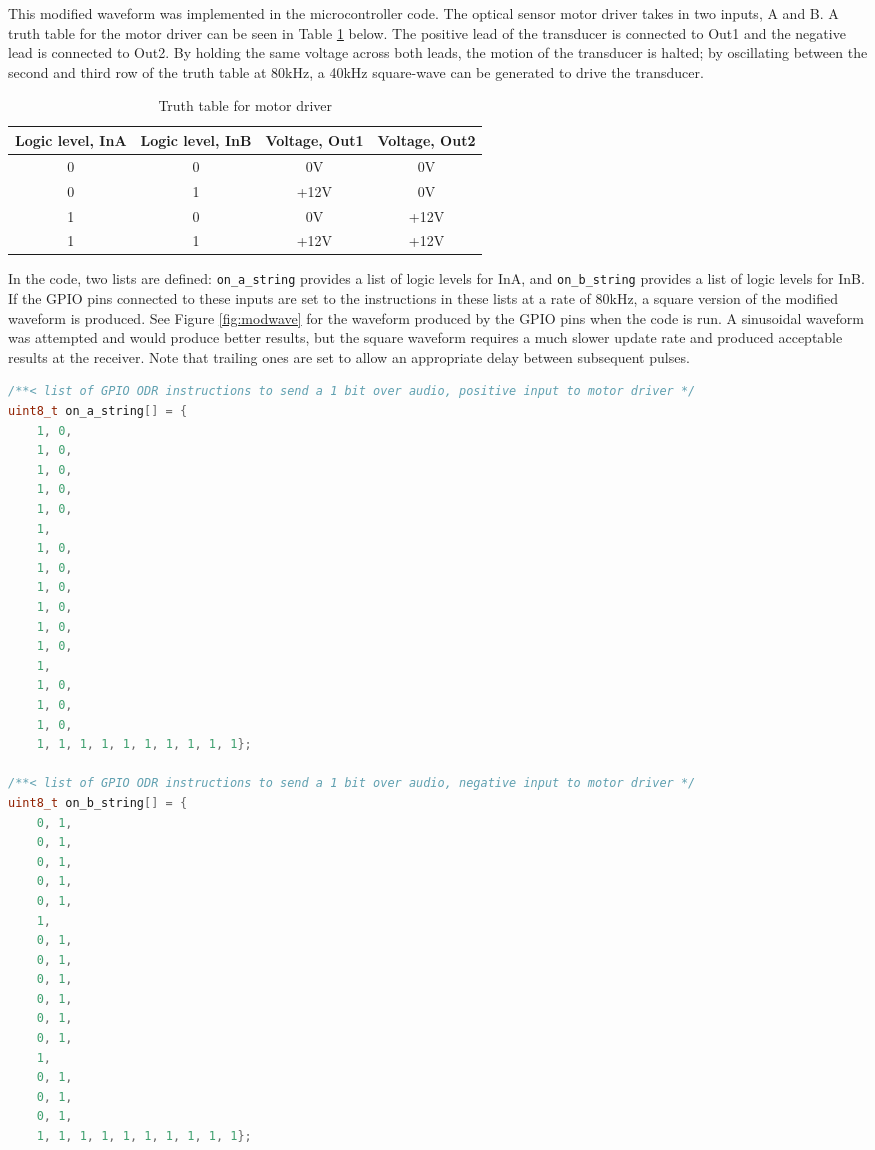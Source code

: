 \documentclass[12pt,a4paper]{report}
\begin{document}
This modified waveform was implemented in the microcontroller code. The optical sensor motor driver takes in two inputs, A and B. A truth table for the motor driver can be seen in Table \ref{tab:truth} below. The positive lead of the transducer is connected to Out1 and the negative lead is connected to Out2. By holding the same voltage across both leads, the motion of the transducer is halted; by oscillating between the second and third row of the truth table at 80kHz, a 40kHz square-wave can be generated to drive the transducer.

\begin{table}[htbp]
	\centering
	\caption{Truth table for motor driver}
	\label{tab:truth}
	\begin{tabular}{|c|c|c|c|}
		\hline
		Logic level, InA & Logic level, InB & Voltage, Out1 & Voltage, Out2 \\
		\hline
		0 & 0 & 0V & 0V \\
		\hline
		0 & 1 & +12V & 0V \\
		\hline
		1 & 0 & 0V & +12V \\
		\hline
		1 & 1 & +12V & +12V \\
		\hline
	\end{tabular}
\end{table}

In the code, two lists are defined: \verb|on_a_string| provides a list of logic levels for InA, and \verb|on_b_string| provides a list of logic levels for InB. If the GPIO pins connected to these inputs are set to the instructions in these lists at a rate of 80kHz, a square version of the modified waveform is produced. See Figure \ref{fig:modwave} for the waveform produced by the GPIO pins when the code is run. A sinusoidal waveform was attempted and would produce better results, but the square waveform requires a much slower update rate and produced acceptable results at the receiver. Note that trailing ones are set to allow an appropriate delay between subsequent pulses.

\pagebreak

\begin{lstlisting}[language=C++]
/**< list of GPIO ODR instructions to send a 1 bit over audio, positive input to motor driver */
uint8_t on_a_string[] = {
	1, 0,
	1, 0,
	1, 0,
	1, 0,
	1, 0,
	1,	
	1, 0,
	1, 0,
	1, 0,
	1, 0,
	1, 0,
	1, 0,
	1,
	1, 0,
	1, 0,
	1, 0,
	1, 1, 1, 1, 1, 1, 1, 1, 1, 1};

/**< list of GPIO ODR instructions to send a 1 bit over audio, negative input to motor driver */
uint8_t on_b_string[] = {
	0, 1,
	0, 1,
	0, 1,
	0, 1,
	0, 1,
	1,
	0, 1,
	0, 1,
	0, 1,
	0, 1,
	0, 1,
	0, 1,
	1,
	0, 1,
	0, 1,
	0, 1,
	1, 1, 1, 1, 1, 1, 1, 1, 1, 1};
\end{lstlisting}
\end{document}
